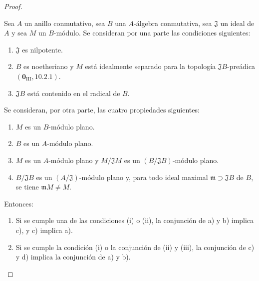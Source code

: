 \begin{proof}
\begin{lemma}[11.3.10.2]
\label{IV.11.3.10.2}
Sea $A$ un anillo conmutativo, sea $B$ una $A$-álgebra conmutativa, sea $\mathfrak J$ un ideal de $A$ y sea $M$ un $B$-módulo. Se consideran por una parte las condiciones siguientes:
\begin{enumerate}[label=\emph{(\roman*)}]
  \item $\mathfrak J$ es nilpotente.
  \item $B$ es noetheriano y $M$ está idealmente separado para la topología $\mathfrak JB$-preádica $(\mathbf 0_{\mathrm{III}},10.2.1)$.
  \item $\mathfrak JB$ está contenido en el radical de $B$.
\end{enumerate}
Se consideran, por otra parte, las cuatro propiedades siguientes:
\begin{enumerate}[label=\emph{\alph*)}]
  \item $M$ es un $B$-módulo plano.
  \item $B$ es un $A$-módulo plano.
  \item $M$ es un $A$-módulo plano y $M/\mathfrak JM$ es un $(B/\mathfrak JB)$-módulo plano.
  \item $B/\mathfrak JB$ es un $(A/\mathfrak J)$-módulo plano y, para todo ideal maximal $\mathfrak m\supset\mathfrak JB$ de $B$, se tiene $\mathfrak mM\neq M$.
\end{enumerate}
Entonces:
\begin{enumerate}[label=\textup{\arabic{enumi}\textsuperscript{o}}]
  \item Si se cumple una de las condiciones \textup{(i)} o \textup{(ii)}, la conjunción de \textup{a)} y \textup{b)} implica \textup{c)}, y \textup{c)} implica \textup{a)}.
  \item {} Si se cumple la condición \textup{(i)} o la conjunción de \textup{(ii)} y \textup{(iii)}, la conjunción de \textup{c)} y \textup{d)} implica la conjunción de \textup{a)} y \textup{b)}.
\end{enumerate}
\end{lemma}


\end{proof}
